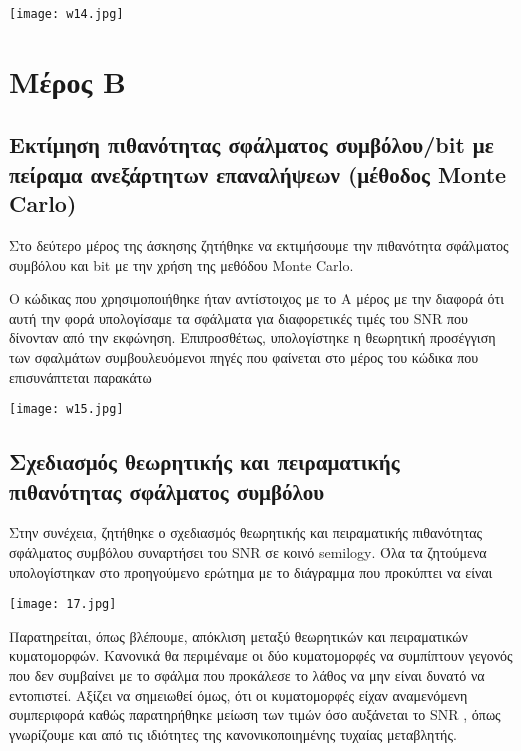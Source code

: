 \documentclass[11pt]{article}
\begin{document}
\begin{center}
	\texttt{[image: w14.jpg]}
\end{center}

\section{Μέρος Β}

\subsection{Εκτίμηση πιθανότητας σφάλματος συμβόλου/\foreignlanguage{english}{bit} με πείραμα ανεξάρτητων επαναλήψεων (μέθοδος \foreignlanguage{english}{Monte Carlo})}

Στο δεύτερο μέρος της άσκησης ζητήθηκε να εκτιμήσουμε την πιθανότητα σφάλματος συμβόλου και \foreignlanguage{english}{bit} με την χρήση της μεθόδου \foreignlanguage{english}{Monte Carlo}.

O κώδικας που χρησιμοποιήθηκε ήταν αντίστοιχος με το Α μέρος με την διαφορά ότι αυτή την φορά υπολογίσαμε τα σφάλματα για διαφορετικές τιμές του \foreignlanguage{english}{SNR} που δίνονταν από την εκφώνηση. Επιπροσθέτως, υπολογίστηκε η θεωρητική προσέγγιση των σφαλμάτων συμβουλευόμενοι πηγές που φαίνεται στο μέρος του κώδικα που επισυνάπτεται παρακάτω

\begin{center}
	\texttt{[image: w15.jpg]}
\end{center}

\subsection{Σχεδιασμός θεωρητικής και πειραματικής πιθανότητας σφάλματος συμβόλου}
Στην συνέχεια, ζητήθηκε ο σχεδιασμός θεωρητικής και πειραματικής πιθανότητας σφάλματος συμβόλου συναρτήσει του \foreignlanguage{english}{SNR} σε κοινό \foreignlanguage{english}{semilogy}. Όλα τα ζητούμενα υπολογίστηκαν στο προηγούμενο ερώτημα με το διάγραμμα που προκύπτει να είναι

\begin{center}
	\texttt{[image: 17.jpg]}
\end{center}

Παρατηρείται, όπως βλέπουμε, απόκλιση μεταξύ θεωρητικών και πειραματικών κυματομορφών. Κανονικά θα περιμέναμε οι δύο κυματομορφές να συμπίπτουν γεγονός που δεν συμβαίνει με το σφάλμα που προκάλεσε το λάθος να μην είναι δυνατό να εντοπιστεί. Αξίζει να σημειωθεί όμως, ότι οι κυματομορφές είχαν αναμενόμενη συμπεριφορά καθώς παρατηρήθηκε μείωση των τιμών όσο αυξάνεται το \foreignlanguage{english}{SNR} , όπως γνωρίζουμε και από τις ιδιότητες της κανονικοποιημένης τυχαίας μεταβλητής.
\end{document}
